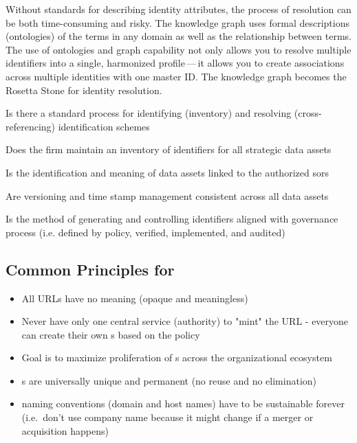 %
%

\ekgmmCapabilitySectionContributionToEnterprise

Without standards for describing identity attributes, the process of resolution can be both time-consuming and risky.
The knowledge graph uses formal descriptions (ontologies) of the terms in any domain as well as the relationship
between terms.
The use of ontologies and graph capability not only allows you to resolve multiple identifiers into a single,
harmonized profile\,---\,it allows you to create associations across multiple identities with one master ID.
The knowledge graph becomes the Rosetta Stone for identity resolution.

\ekgmmCapabilitySectionDimensions

\begin{core-questions}

  \item [\thesection.1] Is there a standard process for identifying (inventory) and resolving (cross-referencing)
                        identification schemes
  \item [\thesection.2] Does the firm maintain an inventory of identifiers for all strategic data assets
  \item [\thesection.3] Is the identification and meaning of data assets linked to the authorized \glspl{sor}
  \item [\thesection.4] Are versioning and time stamp management consistent across all data assets
  \item [\thesection.5] Is the method of generating and controlling identifiers aligned with governance process
                        (i.e. defined by policy, verified, implemented, and audited)

\end{core-questions}

\subsection*{Common Principles for }

\begin{itemize}
  \item All URLs have no meaning (opaque and meaningless)
  \item Never have only one central service (authority) to "mint" the URL - everyone can create their own
        s based on the policy
  \item Goal is to maximize proliferation of s across the organizational ecosystem
  \item {}s are universally unique and permanent (no reuse and no elimination)
  \item {} naming conventions (domain and host names) have to be sustainable forever
        (i.e.\ don't use company name because it might change if a merger or acquisition happens)
\end{itemize}

